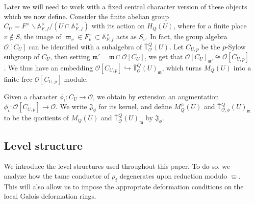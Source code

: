 \documentclass[a4paper, notitlepage, 10pt]{amsart}
\theoremstyle{plain} %
\theoremstyle{definition} %
\theoremstyle{remark} %
\numberwithin{equation}{section}
\begin{document}
\subsubsection{}  Later we will need to work with a fixed central character version of these objects which we now define. Consider the finite abelian group $C_U=F^\times \backslash \mathbb{A}^\times_{F,f}/(U\cap \mathbb{A}_{F,f}^\times)$ with its action on $H_Q(U)$, where for a finite place $v\not\in  S$, the image of $\varpi_v\in F^\times_v\subset \mathbb{A}_{F,f}^\times$ acts as $S_v$. In fact, the group algebra $\mathcal{O}[C_U]$ can be identified with a subalgebra of $\overline{\mathbb{T}}{}^{Q}_{\mathcal{O}}(U)$.
Let $C_{U,p}$ be the $p$-Sylow subgroup of $C_U$, then setting $\mathfrak{m}'=\mathfrak{m}\cap \mathcal{O}[C_U]$, we get that $\mathcal{O}[C_U]_{\mathfrak{m'}}\cong \mathcal{O}[C_{U,p}]$. We thus have an embedding $\mathcal{O}[C_{U,p}]\hookrightarrow \overline{\mathbb{T}}{}^{Q}_{\mathcal{O}}(U)_{\mathfrak{m}}$, which turns $M_Q(U)$ into a finite free $\mathcal{O}[C_{U,p}]$-module.

Given a character $\phi_{\iota}\colon C_U\to \mathcal{O}$, we obtain by extension an augmentation $\phi_\iota\colon \mathcal{O}[C_{U,p}]\rightarrow \mathcal{O}$. We write $\mathfrak{J}_\phi$ for its kernel, and define $M_{Q}^\phi(U)$ and $\overline{\mathbb{T}}{}^{Q}_{\mathcal{O},\phi}(U)_{\mathfrak{m}}$ to be the quotients of $M_Q(U)$ and $\overline{\mathbb{T}}{}^{Q}_{\mathcal{O}}(U)_{\mathfrak{m}}$ by $\mathfrak{J}_\phi$. 

\subsection{Level structure}\label{levelstructure}
We introduce the level structures used throughout this paper. To do so, we analyze how the tame conductor of $\rho_{\mathbf{f}}$ degenerates upon reduction modulo $\varpi$. This will also allow us to impose the appropriate deformation conditions on the local Galois deformation rings.
\end{document}
